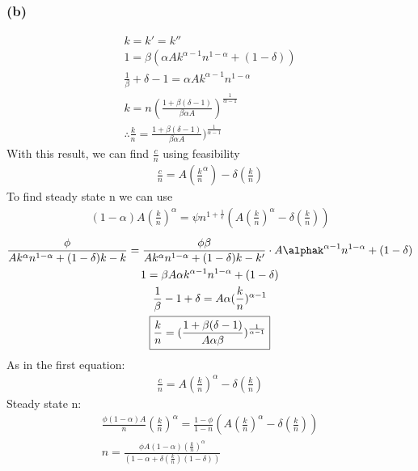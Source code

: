 \documentclass[10pt, a4paper]{article}
\begin{document}
  \subsubsection*{(b)}
    \begin{gather*}
      k=k'=k''\\
      1 = \beta(\alpha Ak^{\alpha-1}n^{1-\alpha}+(1-\delta))\\
      \frac{1}{\beta} +\delta - 1 = \alpha Ak^{\alpha-1}n^{1-\alpha}\\
      \boxed{k = n(\frac{1 + \beta(\delta-1)}{\beta\alpha A})^{\frac{1}{\alpha-1}}} \\
      \boxed{\therefore\frac{k}{n}=\frac{1 + \beta(\delta-1)}{\beta\alpha A})^{\frac{1}{\alpha-1}}}
    \end{gather*}
    With this result, we can find $\frac{c}{n}$ using feasibility 
    \begin{gather*}
      \boxed{\frac{c}{n} = A(\frac{k}{n}^{\alpha})-\delta(\frac{k}{n})}
    \end{gather*}
    To find steady state n we can use
    \begin{gather*}
      \boxed{(1-\alpha)A(\frac{k}{n})^{\alpha}=\psi n^{1+\frac{1}{\epsilon}}(A(\frac{k}{n})^{\alpha}-\delta(\frac{k}{n}))}
    \end{gather*}
    \begin{gather*}
      \frac{\phi}{Ak^{\alpha}n^{1-\alpha}+(1-\delta)k-k} = \frac{\phi\beta}{Ak^{\alpha}n^{1-\alpha}+(1-\delta)k-k'} \cdot A\alphak^{\alpha-1}n^{1-\alpha}+(1-\delta)\\
      1 = \beta A\alpha k^{\alpha-1}n^{1-\alpha}+(1-\delta)\\
      \frac{1}{\beta}-1+\delta = A\alpha (\frac{k}{n})^{\alpha-1} \\
      \boxed{\frac{k}{n} = (\frac{1+\beta(\delta-1)}{A\alpha\beta})^{\frac{1}{\alpha-1}}}
    \end{gather*}
    As in the first equation:
    \begin{gather*}
      \boxed{\frac{c}{n} = A(\frac{k}{n})^{\alpha}-\delta(\frac{k}{n})}
    \end{gather*}
    Steady state n:
    \begin{gather*}
      \frac{\phi(1-\alpha)A}{n}(\frac{k}{n})^{\alpha} = \frac{1-\phi}{1-n}(A(\frac{k}{n})^{\alpha}-\delta(\frac{k}{n}))\\
      \boxed{n = \frac{\phi A(1-\alpha)(\frac{k}{n})^{\alpha}}{(1-\alpha+\delta(\frac{k}{n})(1-\delta))}}
    \end{gather*}
\end{document}
